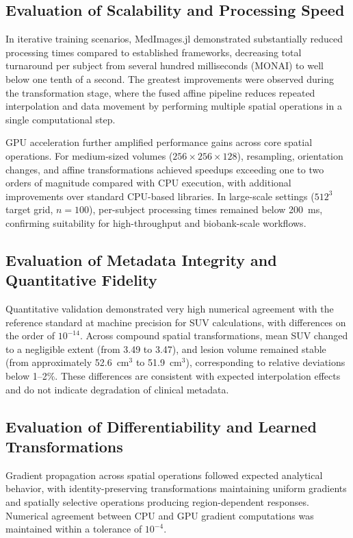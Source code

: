 \documentclass[a4paper,10pt]{elsarticle}
\begin{document}
\subsection*{Evaluation of Scalability and Processing Speed}
In iterative training scenarios, MedImages.jl demonstrated substantially reduced processing times compared to established frameworks, decreasing total turnaround per subject from several hundred milliseconds (MONAI) to well below one tenth of a second. The greatest improvements were observed during the transformation stage, where the fused affine pipeline reduces repeated interpolation and data movement by performing multiple spatial operations in a single computational step. 

GPU acceleration further amplified performance gains across core spatial operations. For medium-sized volumes ($256 \times 256 \times 128$), resampling, orientation changes, and affine transformations achieved speedups exceeding one to two orders of magnitude compared with CPU execution, with additional improvements over standard CPU-based libraries. In large-scale settings ($512^3$ target grid, $n=100$), per-subject processing times remained below 200~ms, confirming suitability for high-throughput and biobank-scale workflows.

\subsection*{Evaluation of Metadata Integrity and Quantitative Fidelity}
Quantitative validation demonstrated very high numerical agreement with the reference standard at machine precision for SUV calculations, with differences on the order of $10^{-14}$. Across compound spatial transformations, mean SUV changed to a negligible extent (from 3.49 to 3.47), and lesion volume remained stable (from approximately 52.6~cm$^3$ to 51.9~cm$^3$), corresponding to relative deviations below 1--2\%. These differences are consistent with expected interpolation effects and do not indicate degradation of clinical metadata.

\subsection*{Evaluation of Differentiability and Learned Transformations}
Gradient propagation across spatial operations followed expected analytical behavior, with identity-preserving transformations maintaining uniform gradients and spatially selective operations producing region-dependent responses. Numerical agreement between CPU and GPU gradient computations was maintained within a tolerance of $10^{-4}$.
\end{document}

